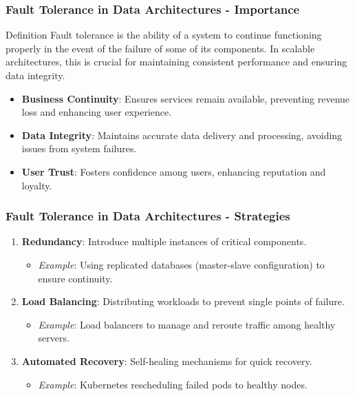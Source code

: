 \documentclass{beamer}
\begin{document}
\begin{frame}[fragile]
    \frametitle{Fault Tolerance in Data Architectures - Importance}
    \begin{block}{Definition}
        Fault tolerance is the ability of a system to continue functioning properly in the event of the failure of some of its components. In scalable architectures, this is crucial for maintaining consistent performance and ensuring data integrity.
    \end{block}
    
    \begin{itemize}
        \item \textbf{Business Continuity}: Ensures services remain available, preventing revenue loss and enhancing user experience.
        \item \textbf{Data Integrity}: Maintains accurate data delivery and processing, avoiding issues from system failures.
        \item \textbf{User Trust}: Fosters confidence among users, enhancing reputation and loyalty.
    \end{itemize}
\end{frame}

\begin{frame}[fragile]
    \frametitle{Fault Tolerance in Data Architectures - Strategies}
    \begin{enumerate}
        \item \textbf{Redundancy}: Introduce multiple instances of critical components.
        \begin{itemize}
            \item \textit{Example}: Using replicated databases (master-slave configuration) to ensure continuity.
        \end{itemize}

        \item \textbf{Load Balancing}: Distributing workloads to prevent single points of failure.
        \begin{itemize}
            \item \textit{Example}: Load balancers to manage and reroute traffic among healthy servers.
        \end{itemize}

        \item \textbf{Automated Recovery}: Self-healing mechanisms for quick recovery.
        \begin{itemize}
            \item \textit{Example}: Kubernetes rescheduling failed pods to healthy nodes.
        \end{itemize}
    \end{enumerate}
\end{frame}
\end{document}
